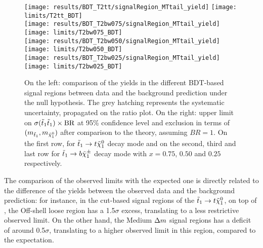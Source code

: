     \begin{figure}[h!]
        \centering
        \texttt{[image: results/BDT\_T2tt/signalRegion\_MTtail\_yield]}
        \texttt{[image: limits/T2tt\_BDT]}\\
        \texttt{[image: results/BDT\_T2bw075/signalRegion\_MTtail\_yield]}
        \texttt{[image: limits/T2bw075\_BDT]}\\
        \texttt{[image: results/BDT\_T2bw050/signalRegion\_MTtail\_yield]}
        \texttt{[image: limits/T2bw050\_BDT]}\\
        \texttt{[image: results/BDT\_T2bw025/signalRegion\_MTtail\_yield]}
        \texttt{[image: limits/T2bw025\_BDT]}\\
        \caption{On the left: comparison of the yields in the different BDT-based signal
        regions between data and the background prediction under the null hypothesis. The
        grey hatching represents the systematic uncertainty, propagated on the ratio plot.
        On the right: upper limit on $\sigma(\tilde{t}_1\tilde{t}_1) \times \text{BR}$ at 95\% confidence level and exclusion in terms of
        $(m_{\tilde{t}_1},m_{\tilde{\chi}_1^0})$ after comparison to the theory, assuming
        $BR = 1$. On the first row, for $\tilde{t}_1 \rightarrow t \tilde{\chi}_1^0$ decay mode and on
        the second, third and last row for $\tilde{t}_1 \rightarrow b \tilde{\chi}_1^\pm$ decay mode
        with $x=0.75$, $0.50$ and $0.25$ respectively.}
        \label{fig:resultsBDT}
    \end{figure}

    The comparison of the observed limits with the expected one is directly related to
    the difference of the yields between the observed data and the background prediction:
    for instance, in the cut-based signal regions of the $\tilde{t}_1 \rightarrow t \tilde{\chi}_1^0$,
    on top of , the Off-shell loose region has a 1.5$\sigma$ excess,
    translating to a less restrictive observed limit. On the other hand, the Medium $\Delta m$
    signal regions has a deficit of around 0.5$\sigma$, translating to a higher observed
    limit in this region, compared to the expectation.

